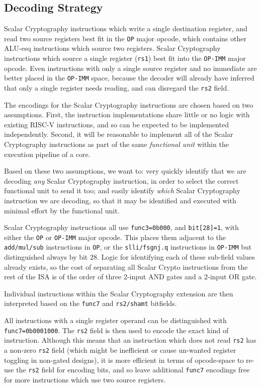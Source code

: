 \subsection{Decoding Strategy}

Scalar Cryptography instructions which write a single
destination register, and read two source registers
best fit in the {\tt OP} major opcode, which contains other ALU-esq
instructions which source two registers.
Scalar Cryptography instructions which source a single register ({\tt rs1})
best fit into the {\tt OP-IMM} major opcode.
Even instructions with only a single source register and no immediate are
better placed in the {\tt OP-IMM} space, because the decoder will already
have inferred that only a single register needs reading, and can disregard
the {\tt rs2} field.

The encodings for the Scalar Cryptography instructions are chosen based on
two assumptions.
First, the instruction implementations share little or no logic with existing
RISC-V instructions, and so can be expected to be implemented
independently.
Second, it will be reasonable to implement all of the Scalar Cryptography
instructions as part of the same {\em functional unit} within the
execution pipeline of a core.

Based on these two assumptions, we want to:
very quickly identify
that we are decoding {\em any} Scalar Cryptography instruction, in order to
select the correct functional unit to send it too; and
easily identify {\em which} Scalar Cryptography instruction we are decoding,
so that it may be identified and executed with minimal effort by the
functional unit.

Scalar Cryptography instructions all use {\tt func3=0b000},
and {\tt bit[28]=1}, with either the {\tt OP} or {\tt OP-IMM} major opcode.
This places them adjacent to the {\tt add/mul/sub} instructions in {\tt OP},
or the {\tt slli/fsgnj.q} instructions in {\tt OP-IMM} 
but distinguished always by bit $28$.
Logic for identifying each of these sub-field values already exists, so
the cost of separating all Scalar Crypto instructions from the rest of the
ISA is of the order of three 2-input AND gates and a 2-input OR gate.

Individual instructions within the Scalar Cryptography extension
are then interpreted based on the {\tt func7} and {\tt rs2/shamt} bitfields.

All instructions with a single register operand can be distinguished
with {\tt func7=0b0001000}.
The {\tt rs2} field is then used to encode the exact kind of instruction.
Although this means that an instruction which does not read {\tt rs2} has
a non-zero {\tt rs2} field (which might be inefficient or cause un-wanted
register toggling in non-gated designs),
it is more efficient in terms of opcode-space to re-use the {\tt rs2} field
for encoding bits, and
so leave additional {\tt func7} encodings free for more instructions which
use two source registers.

